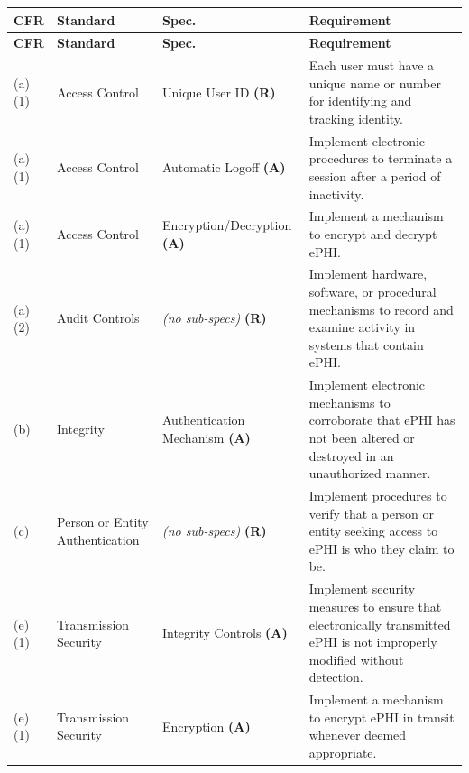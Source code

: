 \documentclass[12pt]{article}
\begin{document}
\newpage
 
\noindent
\begin{longtable}{p{0.9cm} p{2.8cm} p{2.8cm} p{5.0cm}}
  \rowcolor{headercol}
  \color{white}\textbf{CFR} &
  \color{white}\textbf{Standard} &
  \color{white}\textbf{Spec.} &
  \color{white}\textbf{Requirement} \\
  \endfirsthead
  \rowcolor{headercol}
  \color{white}\textbf{CFR} &
  \color{white}\textbf{Standard} &
  \color{white}\textbf{Spec.} &
  \color{white}\textbf{Requirement} \\
  \endhead
  \midrule
 
  (a)(1) &
  Access Control &
  Unique User ID \textbf{(R)} &
  Each user must have a unique name or number for identifying and tracking
  identity. \\[4pt]
 
  (a)(1) &
  Access Control &
  Automatic Logoff \textbf{(A)} &
  Implement electronic procedures to terminate a session after a period of
  inactivity. \\[4pt]
 
  (a)(1) &
  Access Control &
  Encryption/Decryption \textbf{(A)} &
  Implement a mechanism to encrypt and decrypt ePHI. \\[4pt]
 
  (a)(2) &
  Audit Controls &
  \textit{(no sub-specs)} \textbf{(R)} &
  Implement hardware, software, or procedural mechanisms to record and examine
  activity in systems that contain ePHI. \\[4pt]
 
  (b) &
  Integrity &
  Authentication Mechanism \textbf{(A)} &
  Implement electronic mechanisms to corroborate that ePHI has not been
  altered or destroyed in an unauthorized manner. \\[4pt]
 
  (c) &
  Person or Entity Authentication &
  \textit{(no sub-specs)} \textbf{(R)} &
  Implement procedures to verify that a person or entity seeking access to
  ePHI is who they claim to be. \\[4pt]
 
  (e)(1) &
  Transmission Security &
  Integrity Controls \textbf{(A)} &
  Implement security measures to ensure that electronically transmitted ePHI
  is not improperly modified without detection. \\[4pt]
 
  (e)(1) &
  Transmission Security &
  Encryption \textbf{(A)} &
  Implement a mechanism to encrypt ePHI in transit whenever deemed
  appropriate. \\[4pt]
 
  \bottomrule
\end{longtable}
 
\end{document}
